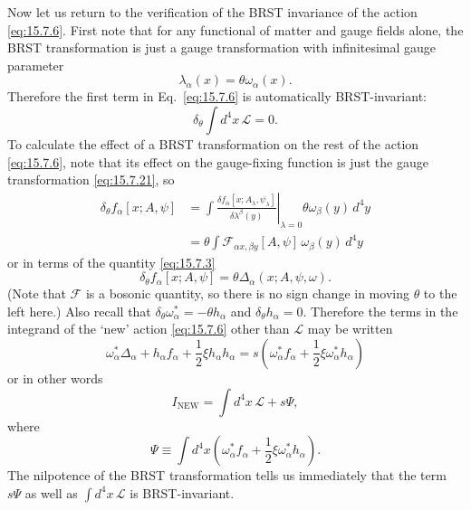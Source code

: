 Now let us return to the verification of the BRST invariance of the action \eqref{eq:15.7.6}. First note that for any functional of matter and gauge fields alone, the BRST transformation is just a gauge transformation with infinitesimal gauge parameter
\begin{equation}
 \lambda_\alpha(x)=\theta\omega_\alpha(x).
 \tag{15.7.21}\label{eq:15.7.21}
\end{equation}
Therefore the first term in Eq.~\eqref{eq:15.7.6} is automatically BRST-invariant:
\begin{equation}
 \delta_\theta\int d^4x\,\mathcal L=0.
 \tag{15.7.22}\label{eq:15.7.22}
\end{equation}
To calculate the effect of a BRST transformation on the rest of the action \eqref{eq:15.7.6}, note that its effect on the gauge-fixing function is just the gauge transformation \eqref{eq:15.7.21}, so
\begin{align*}
 \delta_\theta f_\alpha[x;A,\psi]
 &=\int\left.\frac{\delta f_\alpha[x;A_\lambda,\psi_\lambda]}{\delta\lambda^\beta(y)}\right|_{\lambda=0}
 \theta\omega_\beta(y)\,d^4y\\
 &=\theta\int \mathcal F_{\alpha x,\beta y}[A,\psi]\,\omega_\beta(y)\,d^4y
\end{align*}
or in terms of the quantity \eqref{eq:15.7.3}
\begin{equation}
 \delta_\theta f_\alpha[x;A,\psi]=\theta\Delta_\alpha(x;A,\psi,\omega).
 \tag{15.7.23}\label{eq:15.7.23}
\end{equation}
(Note that $\mathcal F$ is a bosonic quantity, so there is no sign change in moving $\theta$ to the left here.) Also recall that $\delta_\theta\omega_\alpha^*=-\theta h_\alpha$ and $\delta_\theta h_\alpha=0$. Therefore the terms in the integrand of the `new' action \eqref{eq:15.7.6} other than $\mathcal L$ may be written
\begin{equation}
 \omega_\alpha^*\Delta_\alpha+h_\alpha f_\alpha+\frac{1}{2}\xi h_\alpha h_\alpha
 =s\left(\omega_\alpha^*f_\alpha+\frac{1}{2}\xi\omega_\alpha^*h_\alpha\right)
 \tag{15.7.24}\label{eq:15.7.24}
\end{equation}
or in other words
\begin{equation}
 I_{\mathrm{NEW}}=\int d^4x\,\mathcal L+s\Psi,
 \tag{15.7.25}\label{eq:15.7.25}
\end{equation}
where
\begin{equation}
 \Psi\equiv\int d^4x\left(\omega_\alpha^*f_\alpha+\frac{1}{2}\xi\omega_\alpha^*h_\alpha\right).
 \tag{15.7.26}\label{eq:15.7.26}
\end{equation}
The nilpotence of the BRST transformation tells us immediately that the term $s\Psi$ as well as $\int d^4x\,\mathcal L$ is BRST-invariant.

